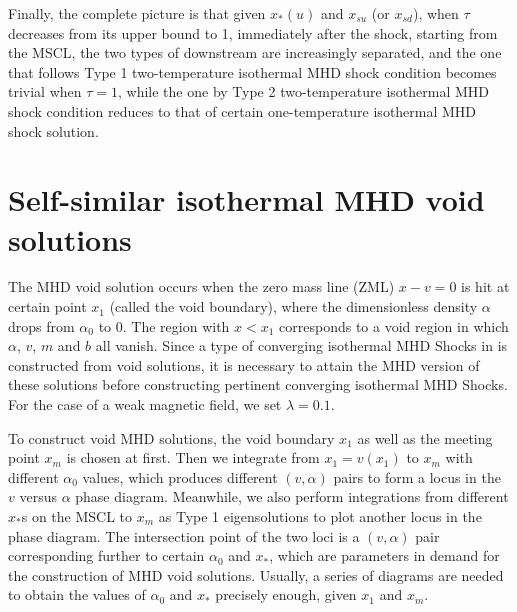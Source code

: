 \documentclass[fleqn,usenatbib]{mnras}
\begin{document}
Finally, the complete picture is that given $x_{*}(u)$ and $x_{su}$ (or $x_{sd}$), when $\tau$ decreases from its upper bound to 1, immediately after the shock, starting from the MSCL, the two types of downstream are increasingly separated, and the one that follows Type 1 two-temperature isothermal MHD shock condition becomes trivial when $\tau=1$, while the one by Type 2 two-temperature isothermal MHD shock condition reduces to that of certain one-temperature isothermal MHD shock solution. 


\section{Self-similar isothermal MHD void solutions}
\label{s4}
The MHD void solution occurs when the zero mass line (ZML) $x-v=0$ is hit at certain point $x_{1}$ (called the void boundary), where the dimensionless density $\alpha$ drops from $\alpha_{0}$ to 0. The region with $x<x_{1}$ corresponds to a void region in which $\alpha$, $v$, $m$ and $b$ all vanish. Since a type of converging isothermal MHD Shocks in \citet{lou2014self} is constructed from void solutions, it is necessary to attain the MHD version of these solutions before constructing pertinent converging isothermal MHD Shocks. For the case of a weak magnetic field, we set $\lambda=0.1$.

To construct void MHD solutions, the void boundary $x_{1}$ as well as the meeting point $x_{m}$ is chosen at first. Then we integrate from $x_{1}=v(x_{1})$ to $x_{m}$ with different $\alpha_{0}$ values, which produces different $(v,\alpha)$ pairs to form a locus in the $v$ versus $\alpha$ phase diagram. Meanwhile, we also perform integrations from different $x_{*}$s on the MSCL to $x_{m}$ as Type 1 eigensolutions to plot another locus in the phase diagram. The intersection point of the two loci is a $(v,\alpha)$ pair corresponding further to certain $\alpha_{0}$ and $x_{*}$, which are parameters in demand for the construction of MHD void solutions. Usually, a series of diagrams are needed to obtain the values of $\alpha_{0}$ and $x_{*}$ precisely enough, given $x_{1}$ and $x_{m}$. 
\end{document}
